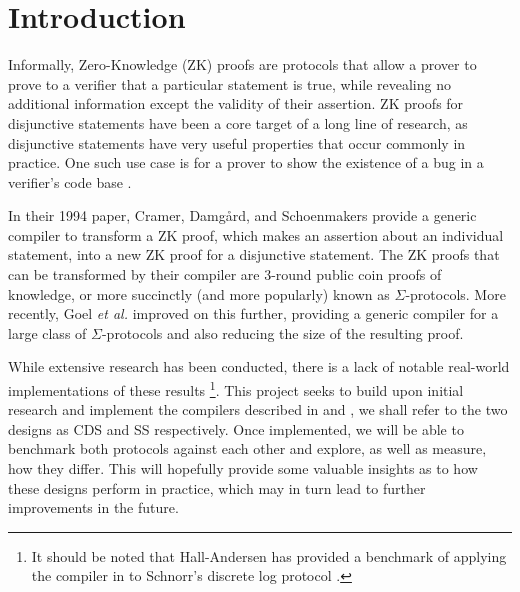 \documentclass[a4paper,fleqn,12pt]{article}
\begin{document}


\pagestyle{plain}

\section{Introduction}
Informally, Zero-Knowledge (ZK) proofs are protocols that allow a prover to prove to a verifier that a particular statement is true, while revealing no additional information except the validity of their assertion. ZK proofs for disjunctive statements have been a core target of a long line of research, as disjunctive statements have very useful properties that occur commonly in practice. One such use case is for a prover to show the existence of a bug in a verifier's code base \cite{StackedGF}.

In their 1994 paper, Cramer, Damg{\aa}rd, and Schoenmakers \cite{CDS94} provide a generic compiler to transform a ZK proof, which makes an assertion about an individual statement, into a new ZK proof for a disjunctive statement. The ZK proofs that can be transformed by their compiler are 3-round public coin proofs of knowledge, or more succinctly (and more popularly) known as $\Sigma$-protocols. %
More recently, Goel {\em et al.} \cite{StackingSigmas} improved on this further, providing a generic compiler for a large class of $\Sigma$-protocols and also reducing the size of the resulting proof. 

While extensive research has been conducted, there is a lack of notable real-world implementations of these results
\footnote{It should be noted that Hall-Andersen \cite{MHAStackSig} has provided a benchmark of applying the compiler in \cite{StackingSigmas} to Schnorr's discrete log protocol \cite{Schnorr}.}. 
This project seeks to build upon initial research and implement the compilers described in \cite{CDS94} and \cite{StackingSigmas}, we shall refer to the two designs as CDS and SS respectively. Once implemented, we will be able to benchmark both protocols against each other and explore, as well as measure, how they differ. This will hopefully provide some valuable insights as to how these designs perform in practice, which may in turn lead to further improvements in the future. 

\end{document}
